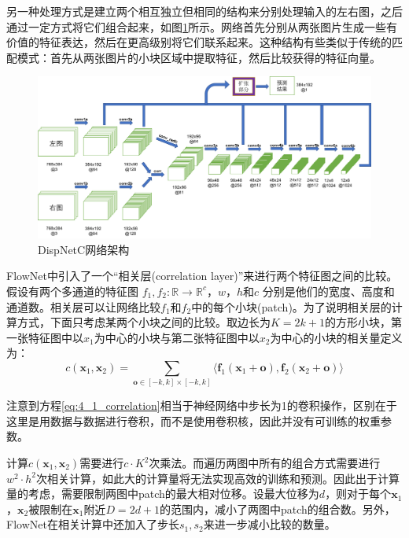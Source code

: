 另一种处理方式是建立两个相互独立但相同的结构来分别处理输入的左右图，之后通过一定方式将它们组合起来，如图\ref{fig:4_1_DispNetC}所示。网络首先分别从两张图片生成一些有价值的特征表达，然后在更高级别将它们联系起来。这种结构有些类似于传统的匹配模式：首先从两张图片的小块区域中提取特征，然后比较获得的特征向量。

\begin{figure}[!htb]
	\centering\includegraphics[width=6in]{figures/4_1_dispnetc_architecture}
	\caption{DispNetC网络架构}\label{fig:4_1_DispNetC}
\end{figure}

FlowNet中引入了一个“相关层(correlation layer)”来进行两个特征图之间的比较。假设有两个多通道的特征图
$f_1, f_2: \mathbb{R} \rightarrow \mathbb{R}^c$，$w$，$h$和$c$ 
分别是他们的宽度、高度和通道数。相关层可以让网络比较$f_1$和$f_2$中的每个小块(patch)。为了说明相关层的计算方式，下面只考虑某两个小块之间的比较。取边长为$K=2k+1$的方形小块，第一张特征图中以$x_1$为中心的小块与第二张特征图中以$x_2$为中心的小块的相关量定义为：
\begin{equation}\label{eq:4_1_correlation}  %
c(\mathbf{x}_1, \mathbf{x}_2) = \sum_{\mathbf{o} \in [-k, k] \times [-k, k]} { \langle \mathbf{f}_1(\mathbf{x}_1 + \mathbf{o}), \mathbf{f}_2(\mathbf{x}_2 + \mathbf{o}) \rangle }
\end{equation}

注意到方程\ref{eq:4_1_correlation}相当于神经网络中步长为1的卷积操作，区别在于这里是用数据与数据进行卷积，而不是使用卷积核，因此并没有可训练的权重参数。

计算$c(\mathbf{x}_1, \mathbf{x}_2)$需要进行$c\cdot K^2$次乘法。而遍历两图中所有的组合方式需要进行$w^2  \cdot h^2$次相关计算，如此大的计算量将无法实现高效的训练和预测。因此出于计算量的考虑，需要限制两图中patch的最大相对位移。设最大位移为$d$，则对于每个$\mathbf{x}_1$，$\mathbf{x}_2$被限制在$\mathbf{x}_1$附近$D=2d+1$的范围内，减小了两图中patch的组合数。另外，FlowNet在相关计算中还加入了步长$s_1, s_2$来进一步减小比较的数量。

